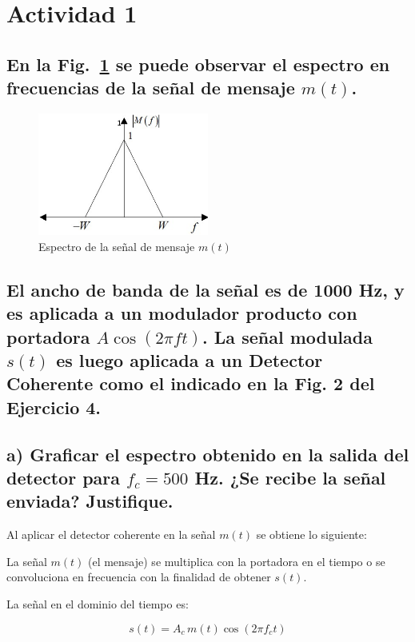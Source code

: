 \section{Actividad 1}  

\subsection*{En la Fig.~\ref{fig:1} se puede observar el espectro en frecuencias de la señal de mensaje $m(t)$.}  

\begin{figure}[H]
    \centering
    \includegraphics[width=0.5\textwidth]{imagenes/Parte_1/Actividad_1/fig1.png}
    \caption{Espectro de la señal de mensaje $m(t)$}
    \label{fig:1}
\end{figure}

\subsection*{El ancho de banda de la señal es de 1000 Hz, y es aplicada a un modulador producto con portadora $A\cos(2\pi f t)$. La señal modulada $s(t)$ es luego aplicada a un Detector Coherente como el indicado en la Fig. 2 del Ejercicio 4.}  


\subsection*{a) Graficar el espectro obtenido en la salida del detector para $f_c=500$ Hz. ¿Se recibe la señal enviada? Justifique.} 


Al aplicar el detector coherente en la señal $m(t)$ se obtiene lo siguiente:
\bigskip

La señal $m(t)$ (el mensaje) se multiplica con la portadora en el tiempo o se convoluciona en frecuencia con la finalidad de obtener $s(t)$.
\bigskip

La señal en el dominio del tiempo es:

\[
s(t) = A_c \, m(t) \cos(2\pi f_c t)
\]

